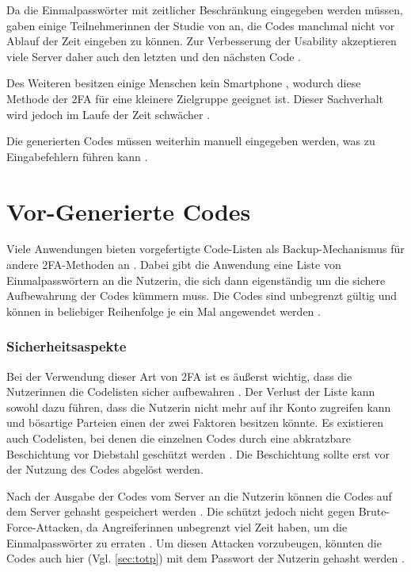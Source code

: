 Da die Einmalpasswörter mit zeitlicher Beschränkung eingegeben werden müssen, gaben einige Teilnehmerinnen der Studie von \textcite{reeseUsabilityStudy2019} an, die Codes manchmal nicht vor Ablauf der Zeit eingeben zu können. Zur Verbesserung der Usability akzeptieren viele Server daher auch den letzten und den nächsten Code \parencite{reeseUsabilityStudy2019}.

Des Weiteren besitzen einige Menschen kein Smartphone \parencite{pewresearchcenterMobileFact2024}, wodurch diese Methode der \ac{2FA} für eine kleinere Zielgruppe geeignet ist. Dieser Sachverhalt wird jedoch im Laufe der Zeit schwächer \parencite{pewresearchcenterMobileFact2024}.

Die generierten Codes müssen weiterhin manuell eingegeben werden, was zu Eingabefehlern führen kann \parencite{decristofaroComparativeUsability2014}.

\section{Vor-Generierte Codes}

Viele Anwendungen bieten vorgefertigte Code-Listen als Backup-Mechanismus für andere \ac{2FA}-Methoden an \parencite{reeseUsabilityStudy2019}. Dabei gibt die Anwendung eine Liste von Einmalpasswörtern an die Nutzerin, die sich dann eigenständig um die sichere Aufbewahrung der Codes kümmern muss. Die Codes sind unbegrenzt gültig und können in beliebiger Reihenfolge je ein Mal angewendet werden \parencite{reeseUsabilityStudy2019}.

\subsubsection{Sicherheitsaspekte}

Bei der Verwendung dieser Art von \ac{2FA} ist es äußerst wichtig, dass die Nutzerinnen die Codelisten sicher aufbewahren \parencite{reeseUsabilityStudy2019}. Der Verlust der Liste kann sowohl dazu führen, dass die Nutzerin nicht mehr auf ihr Konto zugreifen kann und bösartige Parteien einen der zwei Faktoren besitzen könnte. Es existieren auch Codelisten, bei denen die einzelnen Codes durch eine abkratzbare Beschichtung vor Diebstahl geschützt werden \parencite{abhishekComprehensiveStudy2013}. Die Beschichtung sollte erst vor der Nutzung des Codes abgelöst werden.

Nach der Ausgabe der Codes vom Server an die Nutzerin können die Codes auf dem Server gehasht gespeichert werden \parencite{reeseUsabilityStudy2019}. Die schützt jedoch nicht gegen Brute-Force-Attacken, da Angreiferinnen unbegrenzt viel Zeit haben, um die Einmalpasswörter zu erraten \parencite{reeseUsabilityStudy2019}. Um diesen Attacken vorzubeugen, könnten die Codes auch hier (Vgl. \ref{sec:totp}) mit dem Passwort der Nutzerin gehasht werden \parencite{reeseUsabilityStudy2019}.


